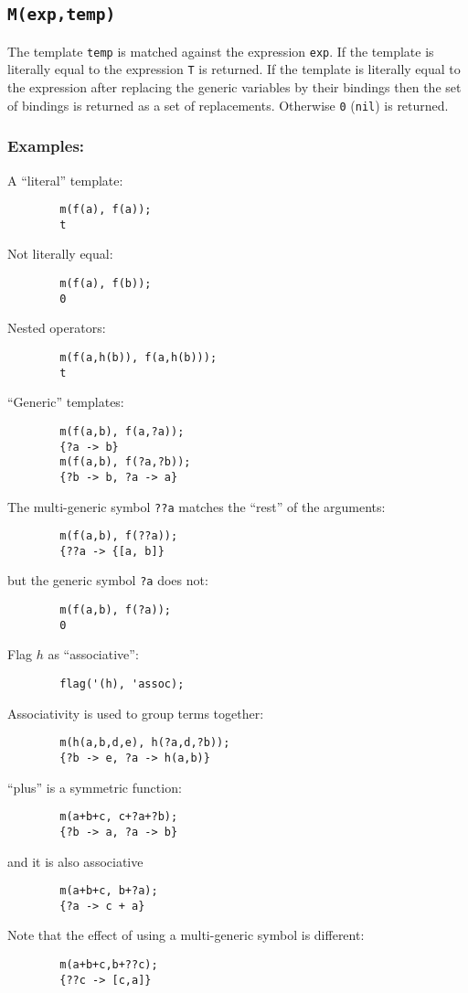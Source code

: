 \subsection{\texttt{M(exp,temp)}} 

The template \texttt{temp} is matched against the expression \texttt{exp}.  If
the template is literally equal to the expression \texttt{T} is returned.  If
the template is literally equal to the expression after replacing the generic
variables by their bindings then the set of bindings is returned as a set of
replacements.  Otherwise \texttt{0} (\texttt{nil}) is returned.

\subsubsection*{Examples:}

A ``literal'' template:
\begin{verbatim}
        m(f(a), f(a));
        t
\end{verbatim}
Not literally equal:
\begin{verbatim}
        m(f(a), f(b));
        0
\end{verbatim}
Nested operators:
\begin{verbatim}
        m(f(a,h(b)), f(a,h(b)));
        t
\end{verbatim}
``Generic'' templates:
\begin{verbatim}
        m(f(a,b), f(a,?a));
        {?a -> b}
        m(f(a,b), f(?a,?b));
        {?b -> b, ?a -> a}
\end{verbatim}
The multi-generic symbol \texttt{??a} matches the ``rest'' of the arguments:
\begin{verbatim}
        m(f(a,b), f(??a));
        {??a -> {[a, b]}
\end{verbatim}
but the generic symbol \texttt{?a} does not:
\begin{verbatim}
        m(f(a,b), f(?a));
        0
\end{verbatim}
Flag $h$ as ``associative'':
\begin{verbatim}
        flag('(h), 'assoc);
\end{verbatim}
Associativity is used to group terms together:
\begin{verbatim}
        m(h(a,b,d,e), h(?a,d,?b));
        {?b -> e, ?a -> h(a,b)}
\end{verbatim}
``plus'' is a symmetric function:
\begin{verbatim}
        m(a+b+c, c+?a+?b);
        {?b -> a, ?a -> b}
\end{verbatim}
and it is also associative
\begin{verbatim}
        m(a+b+c, b+?a);
        {?a -> c + a}
\end{verbatim}
Note that the effect of using a multi-generic symbol is different:
\begin{verbatim}
        m(a+b+c,b+??c);
        {??c -> [c,a]}
\end{verbatim}



